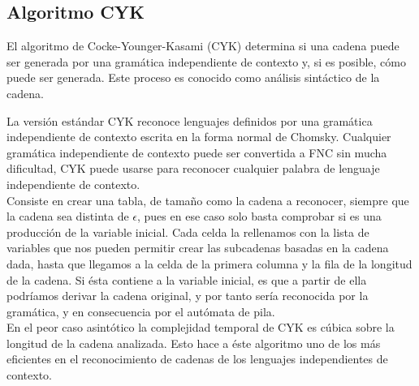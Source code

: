 \documentclass[12pt,a4paper,spanish]{book}
\begin{document}
\subsection{Algoritmo CYK\\}
\label{sec:cyk}
El algoritmo de Cocke-Younger-Kasami (CYK) determina si una cadena puede ser generada por una gram\'atica independiente de contexto y, si es posible, c\'omo puede ser generada. Este proceso es conocido como an\'alisis sint\'actico de la cadena. 

La versi\'on est\'andar CYK reconoce lenguajes definidos por una gram\'atica independiente de contexto escrita en la forma normal de Chomsky. Cualquier gram\'atica independiente de contexto puede ser convertida a FNC sin mucha dificultad, CYK puede usarse para reconocer cualquier palabra de lenguaje independiente de contexto.\\

Consiste en crear una tabla, de tama\~{n}o como la cadena a reconocer, siempre que la cadena sea distinta de $\epsilon$, pues en ese caso solo basta comprobar si es una producci\'on de la variable inicial. Cada celda la rellenamos con la lista de variables que nos pueden permitir crear las subcadenas basadas en la cadena dada, hasta que llegamos a la celda de la primera columna y la fila de la longitud de la cadena. Si \'esta contiene a la variable inicial, es que a partir de ella podr\'iamos derivar la cadena original, y por tanto ser\'ia reconocida por la gram\'atica, y en consecuencia por el aut\'omata de pila.\\

En el peor caso asint\'otico la complejidad temporal de CYK es c\'ubica sobre la longitud de la cadena analizada. Esto hace a \'este algoritmo uno de los m\'as eficientes en el reconocimiento de cadenas de los lenguajes independientes de contexto.\\ \newline \newline
\end{document}
